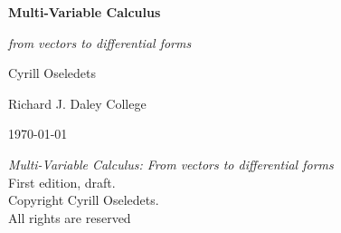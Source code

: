 \thispagestyle{empty}
\begin{titlepage}
  \centering
  \vspace*{2cm}

  {\Huge\sffamily\bfseries Multi-Variable Calculus\par}
  \vspace{1cm}
  {\Large\sffamily\itshape from vectors to differential forms\par}
  \vfill

  {\Large Cyrill Oseledets\par}
  \vspace{0.5cm}
  {\large Richard J. Daley College\par}
  \vfill

  {\large \today\par}
\end{titlepage}

\thispagestyle{empty}
\null
\vfill
\noindent\textit{Multi-Variable Calculus: From vectors to differential forms}\\
First edition, draft.\\[1ex]
Copyright \textcopyright{} \the\year{} Cyrill Oseledets.\\[1ex]
\noindent All rights are reserved
\clearpage
